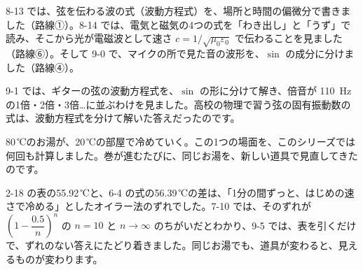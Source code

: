 
\label{bk:9-13:hado}8-13 では、弦を伝わる波の式（波動方程式）を、場所と時間の偏微分で書きました（路線①）。8-14 では、電気と磁気の4つの式を「わき出し」と「うず」で読み、そこから光が電磁波として速さ $c=1/\sqrt{\mu_0\varepsilon_0}$ で伝わることを見ました（路線⑥）。そして 9-0 で、マイクの所で見た音の波形を、$\sin$ の成分に分けました（路線④）。

\begin{bkfigure}
\end{bkfigure}

9-1 では、ギターの弦の波動方程式を、$\sin$ の形に分けて解き、倍音が \qty{110}{Hz} の1倍・2倍・3倍…に並ぶわけを見ました。高校の物理で習う弦の固有振動数の式は、波動方程式を分けて解いた答えだったのです。



\label{bk:9-13:oyu}80\,℃のお湯が、20\,℃の部屋で冷めていく。この1つの場面を、このシリーズでは何回も計算しました。巻が進むたびに、同じお湯を、新しい道具で見直してきたのです。

\begin{bkfigure}
\end{bkfigure}

2-18 の表の55.92\,℃と、6-4 の式の56.39\,℃の差は、「1分の間ずっと、はじめの速さで冷める」としたオイラー法のずれでした。7-10 では、そのずれが $\left(1-\dfrac{0.5}{n}\right)^n$ の $n=10$ と $n\to\infty$ のちがいだとわかり、9-5 では、表を引くだけで、ずれのない答えにたどり着きました。同じお湯でも、道具が変わると、見えるものが変わります。

